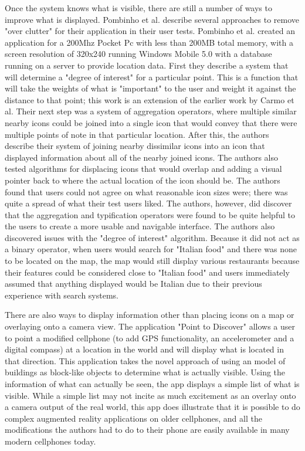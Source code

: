 \documentclass{acm_proc_article-sp}
\begin{document}
Once the system knows what is visible, there are still a number of ways to improve what is displayed.  Pombinho et al. describe several approaches to remove "over clutter" for their application in their user tests.  Pombinho et al. created an application for a 200Mhz Pocket Pc with less than 200MB total memory, with a screen resolution of 320x240 running Windows Mobile 5.0 with a database running on a server to provide location data.  First they describe a system that will determine a "degree of interest" for a particular point. This is a function that will take the weights of what is "important" to the user and weight it against the distance to that point; this work is an extension of the earlier work by Carmo et al. \cite{carmo2008movisys}  Their next step was a system of aggregation operators, where multiple similar nearby icons could be joined into a single icon that would convey that there were multiple points of note in that particular location.  After this, the authors describe their system of joining nearby dissimilar icons into an icon that displayed information about all of the nearby joined icons.  The authors also tested algorithms for displacing icons that would overlap and adding a visual pointer back to where the actual location of the icon should be.  The authors found that users could not agree on what reasonable icon sizes were; there was quite a spread of what their test users liked.  The authors, however, did discover that the aggregation and typification operators were found to be quite helpful to the users to create a more usable and navigable interface. The authors also discovered issues with the "degree of interest" algorithm.  Because it did not act as a binary operator, when users would search for "Italian food" and there was none to be located on the map, the map would still display various restaurants because their features could be considered close to "Italian food" and users immediately assumed that anything displayed would be Italian due to their previous experience with search systems.  \cite{pombinho2009evaluation}

There are also ways to display information other than placing icons on a map or overlaying onto a camera view.  The application "Point to Discover" allows a user to point a modified cellphone (to add GPS functionality, an accelerometer and a digital compass) at a location in the world and will display what is located in that direction.  This application takes the novel approach of using an model of buildings as block-like objects to determine what is actually visible.  Using the information of what can actually be seen, the app displays a simple list of what is visible. While a simple list may not incite as much excitement as an overlay onto a camera output of the real world, this app does illustrate that it is possible to do complex augmented reality applications on older cellphones, and all the modifications the authors had to do to their phone are easily available in many modern cellphones today. \cite{simonpoint}
\end{document}

